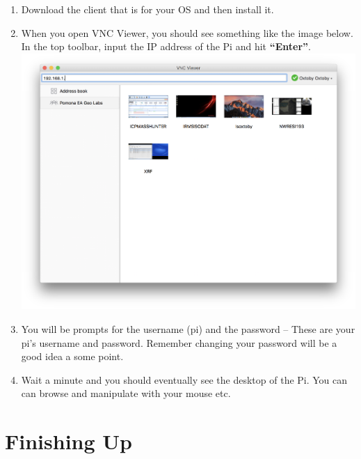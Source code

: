 \documentclass{article}
\begin{document}
\begin{enumerate}
  \item Download the client that is for your OS and then install it.  
  \item When you open VNC Viewer, you should see something like the image below. In the top toolbar, input the IP address of the Pi and hit \textbf{``Enter''}.
  \includegraphics[width=1.00\textwidth]{realvnc}
  \item You will be prompts for the username (pi) and the password -- These are your pi's username and password. Remember changing your password will be a good idea a some point.
  \item Wait a minute and you should eventually see the desktop of the Pi. You can can browse and manipulate with your mouse etc.
\end{enumerate}

\section{Finishing Up}
\end{document}
